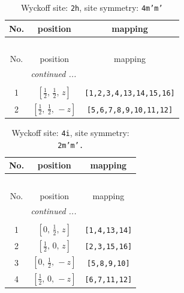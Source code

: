 \documentclass[fleqn,8pt]{jsarticle}
\begin{document}
\begin{longtable}{ccc}
\caption{Wyckoff site: {\tt 2h}, site symmetry: {\tt 4m'm'}}
 \\
 \hline \hline
No. & position & mapping \\ \hline \endfirsthead

\multicolumn{2}{l}{\tablename\ \thetable{}} \\
 \hline \hline
No. & position & mapping \\ \hline \endhead

 \hline \hline
\multicolumn{2}{r}{\footnotesize\it continued ...} \\ \endfoot

 \hline \hline
\multicolumn{2}{r}{} \\ \endlastfoot

1 & $\left[ \frac{1}{2},\, \frac{1}{2},\, z \right]$ & {\tt [1,2,3,4,13,14,15,16]} \\ \hline
2 & $\left[ \frac{1}{2},\, \frac{1}{2},\, - z \right]$ & {\tt [5,6,7,8,9,10,11,12]} \\
\end{longtable}
\renewcommand{\arraystretch}{1.2}
\begin{longtable}{ccc}
\caption{Wyckoff site: {\tt 4i}, site symmetry: {\tt 2m'm'.}}
 \\
 \hline \hline
No. & position & mapping \\ \hline \endfirsthead

\multicolumn{2}{l}{\tablename\ \thetable{}} \\
 \hline \hline
No. & position & mapping \\ \hline \endhead

 \hline \hline
\multicolumn{2}{r}{\footnotesize\it continued ...} \\ \endfoot

 \hline \hline
\multicolumn{2}{r}{} \\ \endlastfoot

1 & $\left[ 0,\, \frac{1}{2},\, z \right]$ & {\tt [1,4,13,14]} \\ \hline
2 & $\left[ \frac{1}{2},\, 0,\, z \right]$ & {\tt [2,3,15,16]} \\ \hline
3 & $\left[ 0,\, \frac{1}{2},\, - z \right]$ & {\tt [5,8,9,10]} \\ \hline
4 & $\left[ \frac{1}{2},\, 0,\, - z \right]$ & {\tt [6,7,11,12]} \\
\end{longtable}
\renewcommand{\arraystretch}{1.2}
\end{document}
